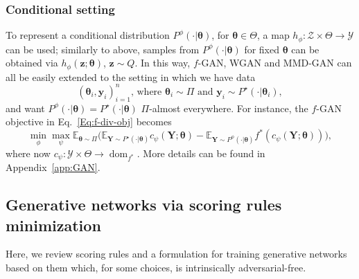 \documentclass[twoside,11pt]{article}
\newcommand{\E}{\mathbb{E}}
\newcommand{\ddtheta}{\boldsymbol{\theta}}
\newcommand{\ddobs}{\mathbf{y}}
\newcommand{\Ddobs}{\mathbf{Y}}
\begin{document}
	\subsubsection{Conditional setting}
	To represent a conditional distribution $ P^\phi(\cdot|\ddtheta) $, for $ \ddtheta\in\Theta  $, 
	a map $h_\phi: \mathcal {Z} \times \Theta \to \mathcal Y$ can be used; similarly to above, samples from $ P^\phi(\cdot|\ddtheta) $ for fixed $ \ddtheta $ can be obtained via $ h_\phi(\mathbf{z};\ddtheta) $, $\mathbf{z}\sim Q $.
	In this way,
	$ f $-GAN, WGAN and MMD-GAN can all be easily extended to the setting in which we have data
	\begin{equation}\label{Eq:joint_data}
	(\ddtheta_i, \ddobs_i)_{i=1}^n\text{, where } \ddtheta_i\sim\Pi \text{ and } \ddobs_i \sim P^\star(\cdot|\ddtheta_i),
	\end{equation} 
	and want
	$ P^\phi(\cdot|\ddtheta) =P^\star(\cdot|\ddtheta) $ $ \Pi $-almost everywhere. For instance, the $ f$-GAN objective in Eq.~\eqref{Eq:f-div-obj} becomes
	\begin{equation*}\label{Eq:f-gan-cond}
	\min_\phi \max_\psi  \E_{ \ddtheta \sim \Pi}\big(\mathbb{E}_{\Ddobs \sim P^\star(\cdot|\ddtheta)}c_\psi(\Ddobs; \ddtheta)
	-\mathbb{E}_{\Ddobs \sim P^\phi(\cdot|\ddtheta)}f^{*}(c_\psi(\Ddobs;\ddtheta))\big),
	\end{equation*}
	where now $ c_\psi: \mathcal {Y} \times \Theta \to \operatorname{dom}_{f^*}$. More details can be found in Appendix~\ref{app:GAN}.	
	
	
	
	
	
	
	
	
	
	
	
	
	
	
	
	
	
	
	
	
	
	
	
	
	
	
	
	
	\subsection{Generative networks via scoring rules minimization}\label{sec:scores}
	
	
	Here, we review scoring rules and a formulation for training generative networks 
	based on them which, for some choices, is intrinsically  adversarial-free. 
	
\end{document}
